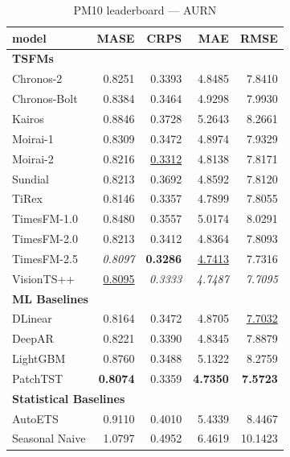 \begin{table}[H]
\caption{PM10 leaderboard --- AURN}
\centering
\begin{small}
\begin{tabular}{lrrrr}
\toprule
model & MASE & CRPS & MAE & RMSE \\
\midrule
\multicolumn{5}{l}{\textbf{TSFMs}} \\
Chronos-2 & 0.8251 & 0.3393 & 4.8485 & 7.8410 \\
Chronos-Bolt & 0.8384 & 0.3464 & 4.9298 & 7.9930 \\
Kairos & 0.8846 & 0.3728 & 5.2643 & 8.2661 \\
Moirai-1 & 0.8309 & 0.3472 & 4.8974 & 7.9329 \\
Moirai-2 & 0.8216 & \underline{0.3312} & 4.8138 & 7.8171 \\
Sundial & 0.8213 & 0.3692 & 4.8592 & 7.8120 \\
TiRex & 0.8146 & 0.3357 & 4.7899 & 7.8055 \\
TimesFM-1.0 & 0.8480 & 0.3557 & 5.0174 & 8.0291 \\
TimesFM-2.0 & 0.8213 & 0.3412 & 4.8364 & 7.8093 \\
TimesFM-2.5 & \textit{0.8097} & \textbf{0.3286} & \underline{4.7413} & 7.7316 \\
VisionTS++ & \underline{0.8095} & \textit{0.3333} & \textit{4.7487} & \textit{7.7095} \\
\midrule
\multicolumn{5}{l}{\textbf{ML Baselines}} \\
DLinear & 0.8164 & 0.3472 & 4.8705 & \underline{7.7032} \\
DeepAR & 0.8221 & 0.3390 & 4.8345 & 7.8879 \\
LightGBM & 0.8760 & 0.3488 & 5.1322 & 8.2759 \\
PatchTST & \textbf{0.8074} & 0.3359 & \textbf{4.7350} & \textbf{7.5723} \\
\midrule
\multicolumn{5}{l}{\textbf{Statistical Baselines}} \\
AutoETS & 0.9110 & 0.4010 & 5.4339 & 8.4467 \\
Seasonal Naive & 1.0797 & 0.4952 & 6.4619 & 10.1423 \\
\bottomrule
\end{tabular}
\end{small}
\end{table}